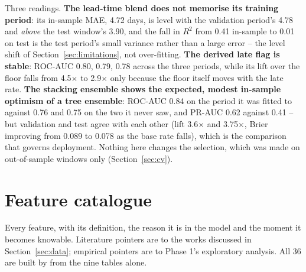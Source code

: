 Three readings. \textbf{The lead-time blend does not memorise its training
period}: its in-sample MAE, 4.72 days, is level with the validation period's
4.78 and \emph{above} the test window's 3.90, and the fall in $R^2$ from 0.41
in-sample to 0.01 on test is the test period's small variance rather than a
large error -- the level shift of Section~\ref{sec:limitations}, not
over-fitting. \textbf{The derived late flag is stable}: ROC-AUC 0.80, 0.79,
0.78 across the three periods, while its lift over the floor falls from
4.5$\times$ to 2.9$\times$ only because the floor itself moves with the late
rate. \textbf{The stacking ensemble shows the expected, modest in-sample
optimism of a tree ensemble}: ROC-AUC 0.84 on the period it was fitted to
against 0.76 and 0.75 on the two it never saw, and PR-AUC 0.62 against 0.41 --
but validation and test agree with each other (lift 3.6$\times$ and
3.75$\times$, Brier improving from 0.089 to 0.078 as the base rate falls),
which is the comparison that governs deployment. Nothing here changes the
selection, which was made on out-of-sample windows only
(Section~\ref{sec:cv}).

\section{Feature catalogue}
\label{app:features}

Every feature, with its definition, the reason it is in the model and the
moment it becomes knowable. Literature pointers are to the works discussed in
Section~\ref{sec:data}; empirical pointers are to Phase 1's exploratory
analysis. All 36 are built by  from the nine tables alone.

